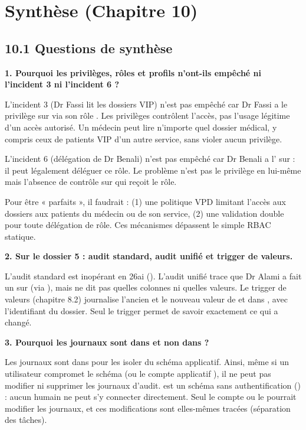 \section{Synthèse (Chapitre 10)}

\subsection{10.1 Questions de synthèse}

\textbf{1. Pourquoi les privilèges, rôles et profils n'ont-ils empêché ni l'incident 3 ni l'incident 6 ?}

L'incident 3 (Dr Fassi lit les dossiers VIP) n'est pas empêché car Dr Fassi a le privilège  sur  via son rôle . Les privilèges contrôlent l'accès, pas l'usage légitime d'un accès autorisé. Un médecin peut lire n'importe quel dossier médical, y compris ceux de patients VIP d'un autre service, sans violer aucun privilège.

L'incident 6 (délégation de Dr Benali) n'est pas empêché car Dr Benali a l' sur  : il peut légalement déléguer ce rôle. Le problème n'est pas le privilège en lui-même mais l'absence de contrôle sur qui reçoit le rôle.

Pour être « parfaits », il faudrait : (1) une politique VPD limitant l'accès aux dossiers aux patients du médecin ou de son service, (2) une validation double pour toute délégation de rôle. Ces mécanismes dépassent le simple RBAC statique.

\textbf{2. Sur le dossier 5 : audit standard, audit unifié et trigger de valeurs.}

L'audit standard est inopérant en 26ai (). L'audit unifié trace que Dr Alami a fait un  sur  (via ), mais ne dit pas quelles colonnes ni quelles valeurs. Le trigger de valeurs (chapitre 8.2) journalise l'ancien et le nouveau valeur de  et  dans , avec l'identifiant du dossier. Seul le trigger permet de savoir exactement ce qui a changé.

\textbf{3. Pourquoi les journaux sont dans  et non dans  ?}

Les journaux sont dans  pour les isoler du schéma applicatif. Ainsi, même si un utilisateur compromet le schéma  (ou le compte applicatif ), il ne peut pas modifier ni supprimer les journaux d'audit.  est un schéma sans authentification () : aucun humain ne peut s'y connecter directement. Seul le compte  ou le  pourrait modifier les journaux, et ces modifications sont elles-mêmes tracées (séparation des tâches).

